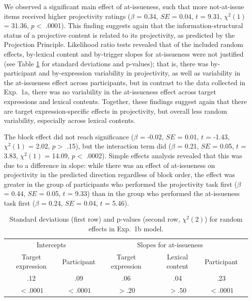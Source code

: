 \documentclass[11pt,fleqn]{article}
\newcommand{\6}{\mbox{$[\hspace*{-.6mm}[$}}
\newcommand{\9}{\mbox{$]\hspace*{-.6mm}]$}}
\newcommand{\tableref}[1]{Table \ref{#1}}
\begin{document}
We observed a significant main effect of at-issueness, such that more not-at-issue items received higher projectivity ratings ($\beta$ = 0.34, $SE$ = 0.04, $t$ = 9.31, $\chi^2(1)$ = 31.36, $p <$ .0001). This finding suggests again that the information-structural status of a projective content is related to its projectivity, as predicted by the Projection Principle. Likelihood ratio tests revealed that of the included random effects, by-lexical content and by-trigger slopes for at-issueness were not justified (see \tableref{tab:random1b} for standard deviations and p-values); that is, there was by-participant and by-expression variability in projectivity, as well as variability in the at-issueness effect across participants, but in contrast to the data collected in Exp.~1a, there was no variability in the at-issueness effect across target expressions and lexical contents. Together, these findings suggest again that there are target expression-specific effects in projectivity, but overall less random variability, especially across lexical contents. 

The block effect did not reach significance ($\beta$ = -0.02, $SE$ = 0.01, $t$ = -1.43, $\chi^2(1)$ = 2.02, $p >$ .15), but the interaction term did ($\beta$ = 0.21, $SE$ = 0.05, $t$ = 3.83, $\chi^2(1)$ = 14.09, $p <$ .0002). Simple effects analysis revealed that this was due to a difference in slope: while there was an effect of at-issueness on projectivity in the predicted direction regardless of block order, the effect was greater in the group of participants who performed the projectivity task first ($\beta$ = 0.44, $SE$ = 0.05, $t$ = 9.33) than in the group who performed the at-issueness task first ($\beta$ = 0.24, $SE$ = 0.04, $t$ = 5.46).


\begin{table}
\begin{center}
\begin{tabular}{c c c c c c }
\toprule
\multicolumn{2}{c}{Intercepts} & \multicolumn{3}{c}{Slopes for at-issueness}\\
Target expression & Participant & Target expression & Lexical content & Participant\\
\midrule
.12 & .09 & .06 & .04 & .23\\
$< .0001$ & $< .0001$ & $> .20$ & $> .50$ & $< .0001$ \\
\bottomrule
\end{tabular}
\caption{Standard deviations (first row) and p-values (second row, $\chi^2(2)$) for random effects in Exp.~1b model.}\label{tab:random1b}
\end{center}
\end{table}
\end{document}
